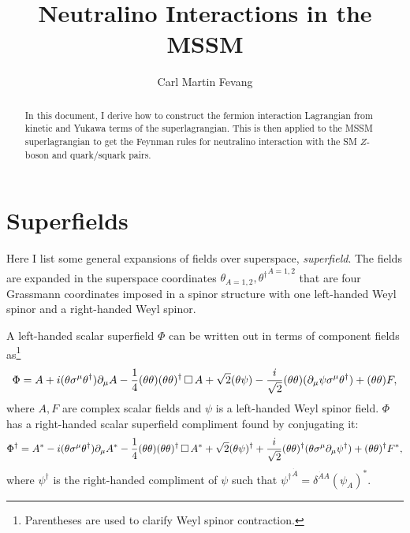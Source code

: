 \documentclass[english, notitlepage]{article}
\title{Neutralino Interactions in the MSSM}
\author{Carl Martin Fevang}
\begin{document}
\maketitle

\begin{abstract}
    \noindent
    In this document, I derive how to construct the fermion interaction Lagrangian from kinetic and Yukawa terms of the superlagrangian.
    This is then applied to the MSSM superlagrangian to get the Feynman rules for neutralino interaction with the SM \(Z\)-boson and quark/squark pairs.
\end{abstract}

\section{Superfields}
Here I list some general expansions of fields over superspace,
\textit{superfield}. The fields are expanded in the superspace coordinates
\(\theta_{A=1,2}, {\theta^\dagger}^{\dot{A}=1,2}\) that are four Grassmann
coordinates imposed in a spinor structure with one left-handed Weyl spinor and
a right-handed Weyl spinor.

A left-handed scalar superfield $\Phi$ can be written out in terms of component
fields as\footnote{Parentheses are used to clarify Weyl spinor contraction.}
\begin{align}
    \Phi = A + i(\theta\sigma^\mu\theta^\dagger) \partial_\mu A - \frac{1}{4} (\theta\theta)(\theta\theta)^\dagger \operatorname{\Box} A +
    \sqrt{2} (\theta\psi) - \frac{i}{\sqrt{2}} (\theta\theta) (\partial_\mu \psi \sigma^\mu \theta^\dagger) + (\theta\theta) F,
\end{align}
where $A, F$ are complex scalar fields and $\psi$ is a left-handed Weyl spinor field.
$\Phi$ has a right-handed scalar superfield compliment found by conjugating it:
\begin{align}
    \Phi^\dag = A^\ast - i(\theta\sigma^\mu\theta^\dagger) \partial_\mu A^\ast - \frac{1}{4} (\theta\theta)(\theta\theta)^\dagger \operatorname{\Box} A^\ast +
    \sqrt{2} (\theta\psi)^\dagger + \frac{i}{\sqrt{2}} (\theta\theta)^\dagger
    (\theta \sigma^\mu \partial_\mu \psi^\dagger) + (\theta\theta)^\dagger F^\ast,
\end{align}
where $\psi^\dagger$ is the right-handed compliment of $\psi$ such that ${\psi^\dagger}^{\dot A} = \delta^{\dot A A} {(\psi_A)}^\ast$.
\end{document}
